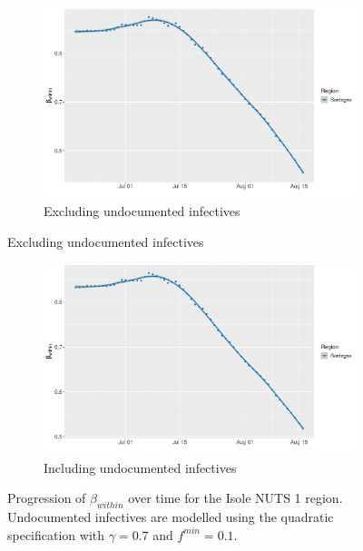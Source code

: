 \documentclass[12pt]{article}
\begin{document}
\begin{appendices}
		\begin{figure}[H]
    	    \centering
    	    \begin{subfigure}{\textwidth}
    	      \centering
    	      \includegraphics[width=0.94\linewidth]{output/model_within_lag14_betawithin_Isole_rolling.pdf}
    	      \caption{Excluding undocumented infectives}
    	      \label{fig:beta_within_over_time_isole_regular}
    	    \end{subfigure}
        \end{figure}
        \begin{figure}[H]\ContinuedFloat
    	    \begin{subfigure}{\textwidth}
    	      \centering
    	      \includegraphics[width=0.94\linewidth]{output/model_within_lag14_betawithin_Isole_UndocQuadratic_rolling.pdf}
    	      \caption{Including undocumented infectives}
    	      \label{fig:beta_within_over_time_isole_regular_undoc}
    	    \end{subfigure}
    	    \caption{Progression of $\beta_{within}$ over time for the Isole NUTS 1 region. Undocumented infectives are modelled using the quadratic specification with $\gamma = 0.7$ and $f^{min}=0.1$.}
    	    \label{fig:beta_within_over_time_isole}
	    \end{figure}
		

\end{appendices}
\end{document}

